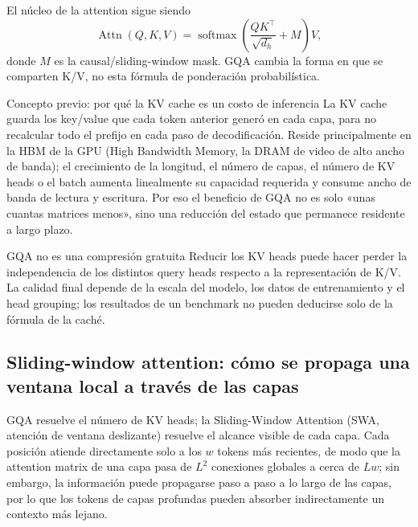 \documentclass[a4paper]{article}
\begin{document}
El núcleo de la attention sigue siendo
\[
\operatorname{Attn}(Q,K,V)=\operatorname{softmax}\!\left(\frac{QK^{\top}}{\sqrt{d_h}}+M\right)V,
\]
donde $M$ es la causal/sliding-window mask. GQA cambia la forma en que se comparten K/V, no esta fórmula de ponderación probabilística.

\begin{knowledgebox}{Concepto previo: por qué la KV cache es un costo de inferencia}
La KV cache guarda los key/value que cada token anterior generó en cada capa, para no recalcular todo el prefijo en cada paso de decodificación. Reside principalmente en la HBM de la GPU (High Bandwidth Memory, la DRAM de video de alto ancho de banda); el crecimiento de la longitud, el número de capas, el número de KV heads o el batch aumenta linealmente su capacidad requerida y consume ancho de banda de lectura y escritura. Por eso el beneficio de GQA no es solo «unas cuantas matrices menos», sino una reducción del estado que permanece residente a largo plazo.
\end{knowledgebox}

\begin{warningbox}{GQA no es una compresión gratuita}
Reducir los KV heads puede hacer perder la independencia de los distintos query heads respecto a la representación de K/V. La calidad final depende de la escala del modelo, los datos de entrenamiento y el head grouping; los resultados de un benchmark no pueden deducirse solo de la fórmula de la caché.
\end{warningbox}


\subsection{Sliding-window attention: cómo se propaga una ventana local a través de las capas}

GQA resuelve el número de KV heads; la Sliding-Window Attention (SWA, atención de ventana deslizante) resuelve el alcance visible de cada capa. Cada posición atiende directamente solo a los $w$ tokens más recientes, de modo que la attention matrix de una capa pasa de $L^2$ conexiones globales a cerca de $Lw$; sin embargo, la información puede propagarse paso a paso a lo largo de las capas, por lo que los tokens de capas profundas pueden absorber indirectamente un contexto más lejano.
\end{document}
